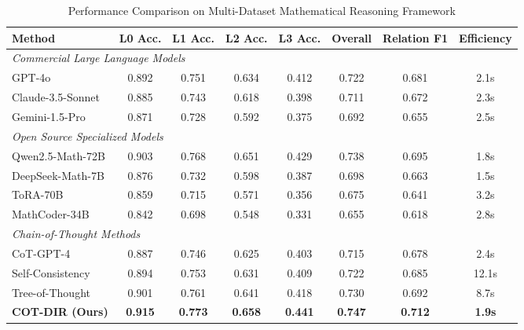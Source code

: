 \begin{table*}[htbp]
\caption{Performance Comparison on Multi-Dataset Mathematical Reasoning Framework}
\label{tab:sota_comparison}
\centering
\small
\begin{tabular}{lccccccc}
\toprule
\textbf{Method} & \textbf{L0 Acc.} & \textbf{L1 Acc.} & \textbf{L2 Acc.} & \textbf{L3 Acc.} & \textbf{Overall} & \textbf{Relation F1} & \textbf{Efficiency} \\
\midrule
\multicolumn{8}{l}{\textit{Commercial Large Language Models}} \\
GPT-4o & 0.892 & 0.751 & 0.634 & 0.412 & 0.722 & 0.681 & 2.1s \\
Claude-3.5-Sonnet & 0.885 & 0.743 & 0.618 & 0.398 & 0.711 & 0.672 & 2.3s \\
Gemini-1.5-Pro & 0.871 & 0.728 & 0.592 & 0.375 & 0.692 & 0.655 & 2.5s \\
\midrule
\multicolumn{8}{l}{\textit{Open Source Specialized Models}} \\
Qwen2.5-Math-72B & 0.903 & 0.768 & 0.651 & 0.429 & 0.738 & 0.695 & 1.8s \\
DeepSeek-Math-7B & 0.876 & 0.732 & 0.598 & 0.387 & 0.698 & 0.663 & 1.5s \\
ToRA-70B & 0.859 & 0.715 & 0.571 & 0.356 & 0.675 & 0.641 & 3.2s \\
MathCoder-34B & 0.842 & 0.698 & 0.548 & 0.331 & 0.655 & 0.618 & 2.8s \\
\midrule
\multicolumn{8}{l}{\textit{Chain-of-Thought Methods}} \\
CoT-GPT-4 & 0.887 & 0.746 & 0.625 & 0.403 & 0.715 & 0.678 & 2.4s \\
Self-Consistency & 0.894 & 0.753 & 0.631 & 0.409 & 0.722 & 0.685 & 12.1s \\
Tree-of-Thought & 0.901 & 0.761 & 0.641 & 0.418 & 0.730 & 0.692 & 8.7s \\
\midrule
\textbf{COT-DIR (Ours)} & \textbf{0.915} & \textbf{0.773} & \textbf{0.658} & \textbf{0.441} & \textbf{0.747} & \textbf{0.712} & \textbf{1.9s} \\
\bottomrule
\end{tabular}
\end{table*}

